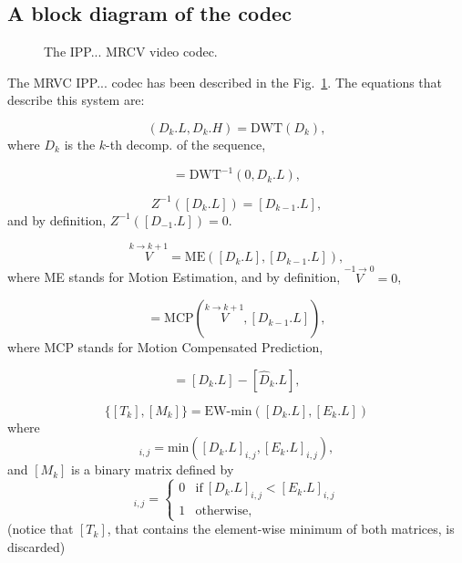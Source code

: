 \subsection{A block diagram of the codec}
\begin{figure}
  \centering
  \caption{The IPP... MRCV video codec.}
  \label{fig:codec}
\end{figure}

The MRVC IPP... codec has been described in the
Fig.~\ref{fig:codec}. The equations that describe this system are:

\begin{equation}
  (D_k.L, D_k.H) = \text{DWT}(D_k),
  \tag{a}
\end{equation}
where $D_k$ is the $k$-th decomp. of the sequence,

\begin{equation}
  [D_k.L] = \text{DWT}^{-1}(0, D_k.L),
  \tag{b}
\end{equation}

\begin{equation}
  Z^{-1}([D_k.L]) = [D_{k-1}.L],
  \tag{c}
\end{equation}
and by definition, $Z^{-1}([D_{-1}.L]) = 0$.

\begin{equation}
  \overset{k\rightarrow k+1}{V} = \text{ME}([D_k.L], [D_{k-1}.L]),
  \tag{d}
\end{equation}
where ME stands for Motion Estimation, and by definition,
$\overset{-1\rightarrow 0}{V}=0$,

\begin{equation}
  [\hat{D}_k.L] = \text{MCP}(\overset{k\rightarrow k+1}{V}, [D_{k-1}.L]),
  \tag{e}
\end{equation}
where MCP stands for Motion Compensated Prediction,

\begin{equation}
  [E_k.L] = [D_k.L] - [\hat{D}_k.L],
  \tag{f}
\end{equation}

\begin{equation}
  \{[T_k],[M_k]\} = \text{EW-min}([D_k.L], [E_k.L])
  \tag{g}
\end{equation}
where
\begin{equation}
  [T_k]_{i,j}=\text{min}([D_k.L]_{i,j}, [E_k.L]_{i,j}),
\end{equation}
and $[M_k]$ is a binary matrix defined by
\begin{equation}
  [M_k]_{i,j} = \left\{
  \begin{array}{ll}
    0 & \text{if}~[D_k.L]_{i,j} < [E_k.L]_{i,j} \\
    1 & \text{otherwise},
  \end{array}
  \right.
  \label{eq:matrix}
\end{equation}
(notice that $[T_k]$, that contains the element-wise minimum of both
matrices, is discarded)

